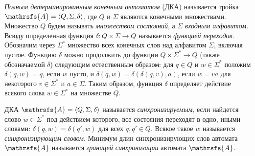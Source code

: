 \documentclass[11pt]{article}
\newcommand{\rl}{reset length}
\begin{document}
\emph{Полным детерминированным конечным автоматом} (ДКА) называется
тройка $\mathrsfs{A}=\langle Q,\Sigma,\delta\rangle$, где $Q$ и
$\Sigma$ являются конечными множествами. Множество $Q$ будем называть \emph{множеством состояний},
а $\Sigma$ \emph{входным алфавитом}. Всюду определенная функция $\delta:Q\times\Sigma\to Q$ 
называется \emph{функцией переходов}. 
Обозначим через $\Sigma^*$ множество всех конечных слов над
алфавитом $\Sigma$, включая пустое.
Функцию $\delta$ можно продолжить до функции $Q\times\Sigma^*\to Q$
(также обозначаемой $\delta$) следующим естественным образом: для
$q\in Q$ и $w\in\Sigma^*$ положим $\delta(q,w)=q$, если $w$ пусто, и 
$\delta(q,w)=\delta(\delta(q,v),a)$, если $w=va$ для некоторого $v\in\Sigma^*$
и $a\in\Sigma$. Таким образом, функция $\delta$ определяет действие всякого слова $w\in\Sigma^*$
на множестве $Q$.



ДКА $\mathrsfs{A}=\langle Q,\Sigma,\delta\rangle$ называется
\emph{синхронизируемым}, если найдется слово $w\in\Sigma^*$
под действием которого, все состояния переходят в одно, иными словами:
$\delta(q,w)=\delta(q',w)$ для всех $q,q'\in Q$. Всякое такое $w$
называется \emph{синхронизирующим словом}. Минимум длин синхронизирующих
слов автомата $\mathrsfs{A}$ называется \emph{границей синхронизации} автомата
$\mathrsfs{A}$.

\end{document}
